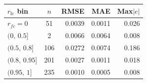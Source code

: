 \begin{tabular}{lcrrr}
\toprule
$r_{\mathrm{fc}}$ bin & $n$ & RMSE & MAE & Max$|e|$ \\
\midrule
$r_{fc}=0$ & 51 & 0.0039 & 0.0011 & 0.026 \\
$(0,\,0.5]$ & 2 & 0.0066 & 0.0064 & 0.008 \\
$(0.5,\,0.8]$ & 106 & 0.0272 & 0.0074 & 0.186 \\
$(0.8,\,0.95]$ & 201 & 0.0027 & 0.0011 & 0.018 \\
$(0.95,\,1]$ & 235 & 0.0010 & 0.0005 & 0.008 \\
\bottomrule
\end{tabular}
